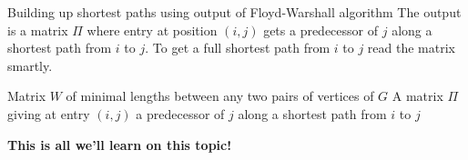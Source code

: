 \documentclass[32pt,aspectratio=169]{beamer}
\begin{document}
\begin{frame}{Building up shortest paths using output of Floyd-Warshall algorithm}
  The output is a matrix $\Pi$ where entry at position $(i, j)$ gets a
  predecessor of $j$ along a shortest path from $i$ to $j$. To get a
  full shortest path from $i$ to $j$ read the matrix smartly.

  \vspace{.3\baselineskip}
    \small{
      \begin{algorithmic}[1]
        \Require Matrix $W$ of minimal lengths between any two pairs of vertices of $G$
        \Ensure A matrix $\Pi$ giving at entry $(i, j)$ a predecessor of
        $j$ along a shortest path from $i$ to $j$
        \EndIf
        \EndFor
        \EndFor
        \EndFor
        \State{\Return{$\Pi$}}
      \end{algorithmic}
    }
\end{frame}

\begin{frame}
  \centering
  \Large \textbf{This is all we'll learn on this topic!}
\end{frame}

\end{document}
